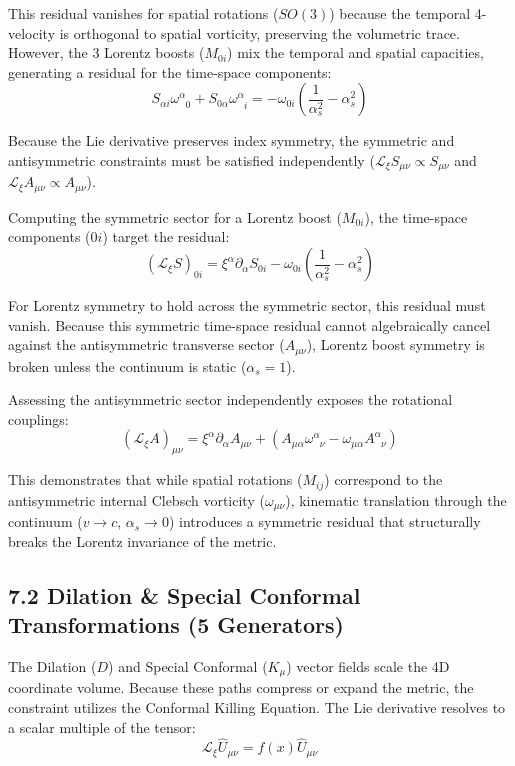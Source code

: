This residual vanishes for spatial rotations ($SO(3)$) because the temporal 4-velocity is orthogonal to spatial vorticity, preserving the volumetric trace. However, the 3 Lorentz boosts ($M_{0i}$) mix the temporal and spatial capacities, generating a residual for the time-space components:
\begin{equation}
    S_{\alpha i} \omega^\alpha_{\phantom{\alpha}0} + S_{0\alpha} \omega^\alpha_{\phantom{\alpha}i} = -\omega_{0i} \left( \frac{1}{\alpha_s^2} - \alpha_s^2 \right)
\end{equation}

Because the Lie derivative preserves index symmetry, the symmetric and antisymmetric constraints must be satisfied independently ($\mathcal{L}_\xi S_{\mu\nu} \propto S_{\mu\nu}$ and $\mathcal{L}_\xi A_{\mu\nu} \propto A_{\mu\nu}$).

Computing the symmetric sector for a Lorentz boost ($M_{0i}$), the time-space components ($0i$) target the residual:
\begin{equation}
    (\mathcal{L}_\xi S)_{0i} = \xi^\alpha \partial_\alpha S_{0i} - \omega_{0i} \left( \frac{1}{\alpha_s^2} - \alpha_s^2 \right)
\end{equation}

For Lorentz symmetry to hold across the symmetric sector, this residual must vanish. Because this symmetric time-space residual cannot algebraically cancel against the antisymmetric transverse sector ($A_{\mu\nu}$), Lorentz boost symmetry is broken unless the continuum is static ($\alpha_s = 1$). 

Assessing the antisymmetric sector independently exposes the rotational couplings:
\begin{equation}
    (\mathcal{L}_\xi A)_{\mu\nu} = \xi^\alpha \partial_\alpha A_{\mu\nu} + (A_{\mu\alpha}\omega^\alpha_{\phantom{\alpha}\nu} - \omega_{\mu\alpha}A^\alpha_{\phantom{\alpha}\nu})
\end{equation}

This demonstrates that while spatial rotations ($M_{ij}$) correspond to the antisymmetric internal Clebsch vorticity ($\omega_{\mu\nu}$), kinematic translation through the continuum ($v \to c$, $\alpha_s \to 0$) introduces a symmetric residual that structurally breaks the Lorentz invariance of the metric.

\subsection*{7.2 Dilation \& Special Conformal Transformations (5 Generators)}
The Dilation ($D$) and Special Conformal ($K_\mu$) vector fields scale the 4D coordinate volume. Because these paths compress or expand the metric, the constraint utilizes the Conformal Killing Equation. The Lie derivative resolves to a scalar multiple of the tensor:
\begin{equation}
    \mathcal{L}_\xi \hat{U}_{\mu\nu} = f(x) \hat{U}_{\mu\nu} \label{eq:conformal_killing}
\end{equation}

